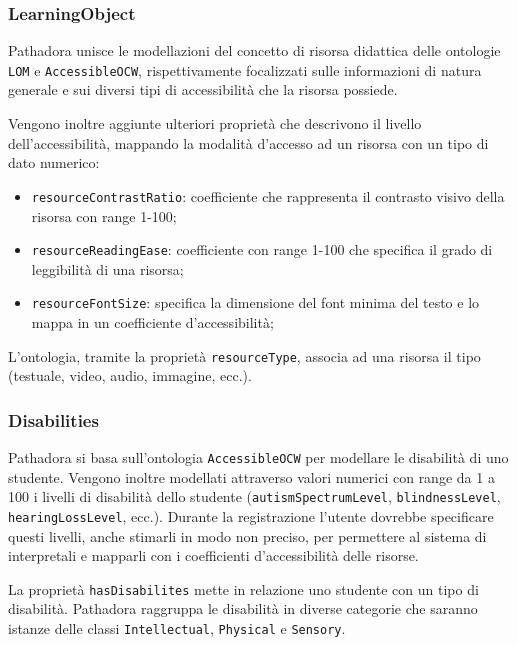 \subsubsection{LearningObject}
Pathadora unisce le modellazioni del concetto di risorsa didattica delle ontologie \texttt{LOM} e \texttt{AccessibleOCW}, rispettivamente focalizzati sulle informazioni di natura generale e sui diversi tipi di accessibilità che la risorsa possiede.

Vengono inoltre aggiunte ulteriori proprietà che descrivono il livello dell'accessibilità, mappando la modalità d'accesso ad un risorsa con un tipo di dato numerico:
\begin{itemize}
    \item \texttt{resourceContrastRatio}: coefficiente che rappresenta il contrasto visivo della risorsa con range 1-100;
    \item \texttt{resourceReadingEase}: coefficiente con range 1-100 che specifica il grado di leggibilità di una risorsa;
    \item \texttt{resourceFontSize}: specifica la dimensione del font minima del testo e lo mappa in un coefficiente d'accessibilità;
\end{itemize}

L'ontologia, tramite la proprietà \texttt{resourceType}, associa ad una risorsa il tipo (testuale, video, audio, immagine, ecc.).

\subsubsection{Disabilities}
Pathadora si basa sull'ontologia \texttt{AccessibleOCW} per modellare le disabilità di uno studente.
Vengono inoltre modellati attraverso valori numerici con range da 1 a 100 i livelli di disabilità dello studente (\texttt{autismSpectrumLevel}, \texttt{blindnessLevel}, \texttt{hearingLossLevel}, ecc.).
Durante la registrazione l'utente dovrebbe specificare questi livelli, anche stimarli in modo non preciso, per permettere al sistema di interpretali e mapparli con i coefficienti d'accessibilità delle risorse.

La proprietà \texttt{hasDisabilites} mette in relazione uno studente con un tipo di disabilità. Pathadora raggruppa le disabilità in diverse categorie che saranno istanze delle classi \texttt{Intellectual}, \texttt{Physical} e \texttt{Sensory}.